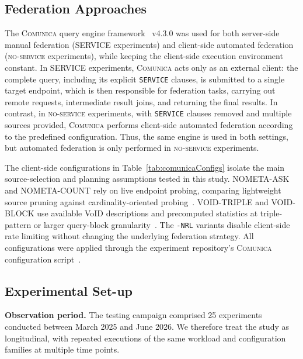 \documentclass[runningheads]{llncs}
\begin{document}
\subsection{Federation Approaches}\label{sec4.3}
The \textsc{Comunica} query engine framework~\cite{taelman2018comunica} v4.3.0 was used for both server-side manual federation (\textsc{SERVICE} experiments) and client-side automated federation (\textsc{no-service} experiments), while keeping the client-side execution environment constant. 
In \textsc{SERVICE} experiments, \textsc{Comunica} acts only as an external client: the complete query, including its explicit \texttt{SERVICE} clauses, is submitted to a single target endpoint, which is then responsible for federation tasks, carrying out remote requests, intermediate result joins, and returning the final results.
In contrast, in \textsc{no-service} experiments, with \texttt{SERVICE} clauses removed and multiple sources provided, \textsc{Comunica} performs client-side automated federation according to the predefined configuration.
Thus, the same engine is used in both settings, but automated federation is only performed in \textsc{no-service} experiments.



The client-side configurations in Table~\ref{tab:comunicaConfigs} isolate the main source-selection and planning assumptions tested in this study. 
\textsc{NOMETA-ASK} and \textsc{NOMETA-COUNT} rely on live endpoint probing, comparing lightweight source pruning against cardinality-oriented probing~\cite{schwarte2011fedx}. 
\textsc{VOID-TRIPLE} and \textsc{VOID-BLOCK} use available VoID descriptions and precomputed statistics at triple-pattern or larger query-block granularity~\cite{splendid2011,w3cvoid,hagedorn2014resource}. 
The \texttt{-NRL} variants disable client-side rate limiting without changing the underlying federation strategy. 
All configurations were applied through the experiment repository's \textsc{Comunica} configuration script~\cite{fedSparqlSurveyExperimentsRepo}.


\subsection{Experimental Set-up}\label{sec4.4}

\textbf{Observation period.}
The testing campaign comprised 25 experiments conducted between March 2025 and June 2026. 
We therefore treat the study as longitudinal, with repeated executions of the same workload and configuration families at multiple time points.
\end{document}
